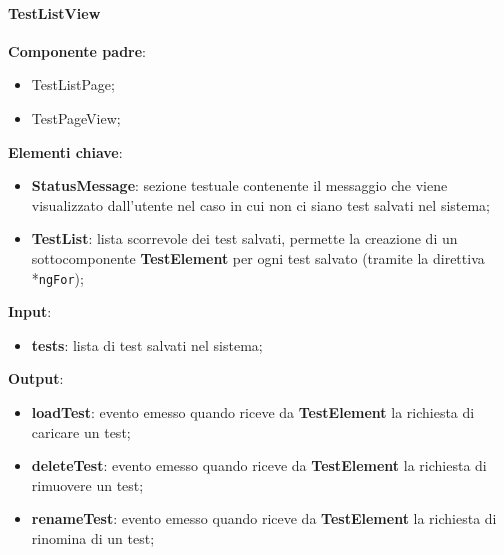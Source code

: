 \paragraph{TestListView}
\textbf{Componente padre}:
\begin{itemize}
    \item TestListPage;
    \item TestPageView;
\end{itemize}
\textbf{Elementi chiave}:
\begin{itemize}
    \item \textbf{StatusMessage}: sezione testuale contenente il messaggio che viene visualizzato dall'utente nel caso in cui non ci siano test salvati nel sistema;
    \item \textbf{TestList}: lista scorrevole dei test salvati, permette la creazione di un sottocomponente \textbf{TestElement} per ogni test salvato (tramite la direttiva *\texttt{ngFor});
\end{itemize}
\textbf{Input}:
\begin{itemize}
    \item \textbf{tests}: lista di test salvati nel sistema;
\end{itemize}
\textbf{Output}:
\begin{itemize}
    \item \textbf{loadTest}: evento emesso quando riceve da \textbf{TestElement} la richiesta di caricare un test;
    \item \textbf{deleteTest}: evento emesso quando riceve da \textbf{TestElement} la richiesta di rimuovere un test;
    \item \textbf{renameTest}: evento emesso quando riceve da \textbf{TestElement} la richiesta di rinomina di un test;
\end{itemize}
